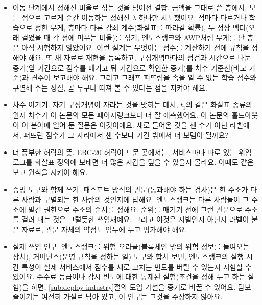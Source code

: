 \begin{itemize}
\item 이동 단계에서 정해진 비율로 섞는 것을 넘어선 결합. 금액을 그대로 쓴 층에서, 모든 점으로 고르게 순간 이동하는 정해진 $\lambda$ 하나만 시도했어요. 점마다 다르거나 학습으로 정한 무게, 층마다 다른 감쇠 계수(화살표를 따라갈 확률), 두 정상 벡터(오래 걸었을 때 각 점에 머무는 비율)를 섞기, 엔도스랭크와 AWP처럼 무게를 단 층은 아직 시험하지 않았어요. 이런 설계는 무엇이든 점수를 계산하기 전에 규칙을 정해야 해요. 또 새 자료로 재현을 등록하고, 구성개념마다의 점검과 시간으로 나눈 증거(앞 기간으로 점수를 매기고 뒤 기간으로 확인한 증거)를 차수 기준선(비교 기준)과 견주어 보고해야 해요. 그리고 그래프 퍼뜨림을 속을 알 수 없는 학습 점수와 구별해 주는 성질, 곧 누구나 따져 볼 수 있다는 점을 지켜야 해요.
\item 차수 이기기. 자기 구성개념이 자라는 것을 맞히는 데서, $t_1$의 같은 화살표 종류의 원시 차수가 이 논문의 모든 페이지랭크보다 더 잘 예측했어요. 이 논문의 홀드아웃이 이 분야에 열어 둔 질문은 이것이에요. 새로 들어온 것을 센 수가 아닌 라벨에서, 퍼뜨린 점수가 그 자리에서 센 수보다 기간 밖에서 더 보탬이 될까요?
\item 더 풍부한 허락의 뜻. ERC-20 허락이 드문 곳에서는, 서비스마다 따로 있는 위임 로그를 화살표 정의에 보태면 더 많은 지갑을 덮을 수 있을지 몰라요. 이때도 같은 보고 원칙을 지켜야 해요.
\item 증명 도구와 함께 쓰기. 패스포트 방식의 관문(통과해야 하는 검사)은 한 주소가 다른 사람과 구별되는 한 사람의 것인지에 답해요. 엔도스랭크는 다른 사람들이 그 주소에 맡긴 권한으로 주소의 순서를 정해요. 순위를 매기기 전에 그런 관문으로 주소를 걸러 내는 것은 그럴듯한 쓰임새예요. 그리고 이것은 시빌인지 아닌지 라벨이 붙은 자료로, 관문 자체의 약점도 염두에 두고 평가해야 해요.
\item 실제 쓰임 연구. 엔도스랭크를 위험 오라클(블록체인 밖의 위험 정보를 들여오는 장치), 거버넌스(운영 규칙을 정하는 일) 도구와 합쳐 보면, 엔도스랭크의 실행 시간 특성이 실제 서비스에서 점수를 새로 고치는 빈도를 버틸 수 있는지 시험할 수 있어요. 수수료 등급이나 감시 빈도에 대한 통제된 실험(조건을 정해 두고 하는 실험)을 하면, \ref{sub:deploy-industry}절의 도입 가설을 증거로 바꿀 수 있어요. 담보 줄이기는 여전히 가설로 남아 있고, 이 연구는 그것을 주장하지 않아요.
\end{itemize}


